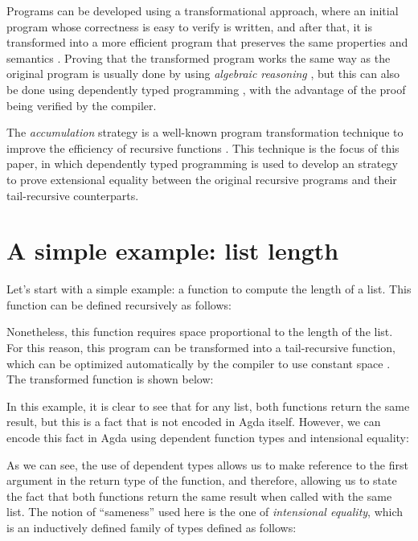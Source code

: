 \documentclass[runningheads]{llncs}
\begin{document}
Programs can be developed using a transformational approach, where an initial program
whose correctness is easy to verify is written, and after that, it is transformed into a
more efficient program that preserves the same properties and semantics
\cite{pettorossi1993rules}. Proving that the transformed program works the same way as
the original program is usually done by using \emph{algebraic reasoning}
\cite{bird1996algebra}, but this can also be done using dependently typed programming
\cite{mu2008algebra}, with the advantage of the proof being verified by the compiler.

The \emph{accumulation} strategy is a well-known program transformation technique to
improve the efficiency of recursive functions \cite{bird1984promotion}. This technique is
the focus of this paper, in which dependently typed programming is used to develop an
strategy to prove extensional equality between the original recursive programs and their
tail-recursive counterparts.

\section{A simple example: list length}

Let's start with a simple example: a function to compute the length of a list. This
function can be defined recursively as follows:



Nonetheless, this function requires space proportional to the length of the list. For
this reason, this program can be transformed into a tail-recursive function, which can be
optimized automatically by the compiler to use constant space
\cite{bauer2003compilation}. The transformed function is shown below:



In this example, it is clear to see that for any list, both functions return the same
result, but this is a fact that is not encoded in Agda itself. However, we can encode
this fact in Agda using dependent function types and intensional equality:



As we can see, the use of dependent types allows us to make reference to the first
argument in the return type of the function, and therefore, allowing us to state the fact
that both functions return the same result when called with the same list. The notion of
``sameness'' used here is the one of \emph{intensional equality}, which is an inductively
defined family of types \cite{dybjer1994inductive,mu2008algebra} defined as follows:
\end{document}

